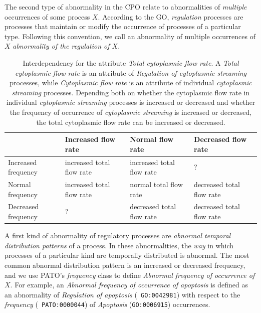\documentclass{bioinfo}
\begin{document}
The second type of abnormality in the CPO relate to abnormalities of
{\em multiple} occurrences of some process $X$. According to the GO,
{\em regulation} processes are processes that maintain or modify the
occurrence of processes of a particular type. Following this
convention, we call an abnormality of multiple occurrences of $X$ {\em
  abnormality of the regulation of $X$}.

\begin{table}
  \centering
  \begin{tabular}{p{2.8cm}|p{4cm}|p{4cm}|p{4cm}}
    & Increased flow rate & Normal flow rate & Decreased
    flow rate \\
    \hline
    Increased frequency &increased total flow rate &increased total
    flow rate &?\\
    Normal frequency &increased total flow rate &normal total flow
    rate &decreased total flow rate\\
    Decreased frequency &?&decreased total flow rate &decreased total
    flow rate\\
    \hline
  \end{tabular}
  \caption{\label{tbl:flow}Interdependency for the attribute {\em
      Total cytoplasmic flow rate}. A {\em Total cytoplasmic flow
      rate} is an attribute of {\em Regulation of cytoplasmic
      streaming} processes, while {\em Cytoplasmic flow rate} is an
    attribute of individual {\em cytoplasmic streaming}
    processes. Depending both on whether the cytoplasmic flow rate in
    individual {\em cytoplasmic streaming} processes is increased or
    decreased and whether the frequency of occurrence of {\em
      cytoplasmic streaming} is increased or decreased, the total
    cytoplasmic flow rate can be increased or decreased.}
\end{table}

A first kind of abnormality of regulatory processes are {\em abnormal
  temporal distribution patterns} of a process. In these
abnormalities, the {\em way} in which processes of a particular kind
are temporally distributed is abnormal.  The most common abnormal
distribution pattern is an increased or decreased frequency, and we
use PATO's {\em frequency} class to define {\em Abnormal frequency of
  occurrence of $X$}.
For example, an {\em Abnormal frequency of occurrence of apoptosis} is
defined as an abnormality of {\em Regulation of apoptosis} ({\tt
  GO:0042981}) with respect to the {\em frequency} ({\tt
  PATO:0000044}) of {\em Apoptosis} ({\tt GO:0006915}) occurrences.
\end{document}
